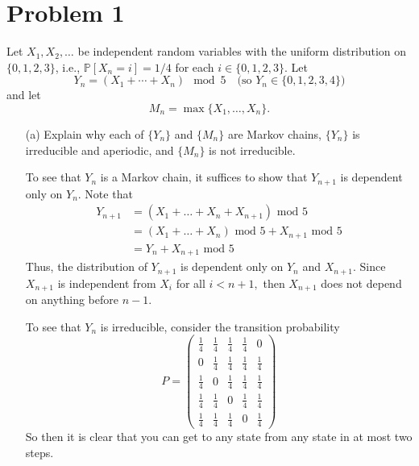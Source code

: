 \documentclass[11pt]{article}
\begin{document}
	
	
	\psetheader

\section*{Problem 1}
\begin{problem}
    Let $X_1, X_2, \ldots$ be independent random variables with the uniform distribution on $\{0, 1, 2, 3\}$, i.e., $\mathbb{P}[X_n = i] = 1/4$ for each $i \in \{0,1,2,3\}$. Let 
\[
Y_n = (X_1 + \cdots + X_n) \mod 5 \quad \text{(so $Y_n \in \{0,1,2,3,4\}$)}
\]
and let 
\[
M_n = \max\{X_1, \ldots, X_n\}.
\]
\end{problem}

\begin{enumerate}
    \item[(a)] Explain why each of $\{Y_n\}$ and $\{M_n\}$ are Markov chains, $\{Y_n\}$ is irreducible and aperiodic, and $\{M_n\}$ is not irreducible.
\begin{solution}
    To see that $Y_n$ is a Markov chain, it suffices to show that $Y_{n+1}$ is dependent only on $Y_n.$ Note that 
    \begin{align*}
        Y_{n+1} &= (X_1 + \dots + X_n + X_{n+1}) \text{ mod } 5\\
        &=(X_1 + \dots + X_n)\text{ mod } 5  + X_{n+1}\text{ mod } 5\\
        &= Y_n+ X_{n+1}\text{ mod } 5
    \end{align*}
    Thus, the distribution of $Y_{n+1}$ is dependent only on $Y_n$ and $X_{n+1}.$ Since $X_{n+1}$ is independent from $X_{i}$ for all $i< n+1,$ then $X_{n+1}$ does not depend on anything before $n-1.$ 

    To see that $Y_n$ is irreducible, consider the transition probability
    \[P = \begin{pmatrix}
        \frac{1}{4} & \frac{1}{4} & \frac{1}{4} & \frac{1}{4} & 0\\
        0 & \frac{1}{4} & \frac{1}{4} & \frac{1}{4} & \frac{1}{4}\\
        \frac{1}{4} & 0 & \frac{1}{4} & \frac{1}{4} & \frac{1}{4}\\
        \frac{1}{4} & \frac{1}{4} & 0 &\frac{1}{4} & \frac{1}{4}\\
        \frac{1}{4} & \frac{1}{4} & \frac{1}{4} & 0 & \frac{1}{4}
    \end{pmatrix}\]
    So then it is clear that you can get to any state from any state in at most two steps. 


\end{solution}
\end{enumerate}
\end{document}
